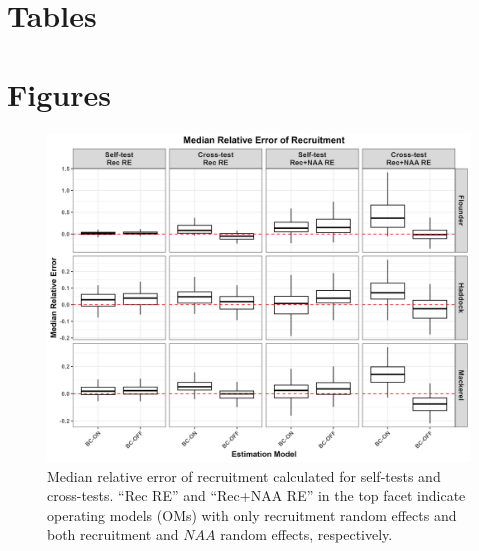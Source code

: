\documentclass[
  12pt,
]{article}
\begin{document}
\hypertarget{tables}{%
\section{Tables}\label{tables}}





\hypertarget{figures}{%
\section{Figures}\label{figures}}

\begin{figure}[H]
\centering
\includegraphics[width=\textwidth]{Revised_Figures&Tables/Median_Rec.PNG}
\caption{Median relative error of recruitment calculated for self-tests and cross-tests. ``Rec RE'' and ``Rec+NAA RE'' in the top facet indicate operating models (OMs) with only recruitment random effects and both recruitment and $NAA$ random effects, respectively.}
\label{fig:Median_Rec}
\end{figure}
\end{document}
